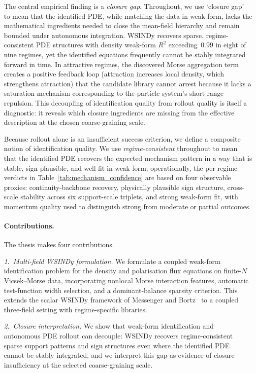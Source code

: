 The central empirical finding is a \emph{closure gap}.  Throughout, we use `closure gap' to mean that the identified PDE, while matching the data in weak form, lacks the mathematical ingredients needed to close the mean-field hierarchy and remain bounded under autonomous integration.  WSINDy recovers sparse, regime-consistent PDE structures with density weak-form $R^2$ exceeding~$0.99$ in eight of nine regimes, yet the identified equations frequently cannot be stably integrated forward in time.  In attractive regimes, the discovered Morse aggregation term creates a positive feedback loop (attraction increases local density, which strengthens attraction) that the candidate library cannot arrest because it lacks a saturation mechanism corresponding to the particle system's short-range repulsion.  This decoupling of identification quality from rollout quality is itself a diagnostic: it reveals which closure ingredients are missing from the effective description at the chosen coarse-graining scale.

Because rollout alone is an insufficient success criterion, we define a composite notion of identification quality.  We use \emph{regime-consistent} throughout to mean that the identified PDE recovers the expected mechanism pattern in a way that is stable, sign-plausible, and well fit in weak form; operationally, the per-regime verdicts in Table~\ref{tab:mechanism_confidence} are based on four observable proxies: continuity-backbone recovery, physically plausible sign structure, cross-scale stability across six support-scale triplets, and strong weak-form fit, with momentum quality used to distinguish strong from moderate or partial outcomes.

\paragraph{Contributions.}
The thesis makes four contributions.

\emph{1.\ Multi-field WSINDy formulation.}
We formulate a coupled weak-form identification problem for the density and polarisation flux equations on finite-$N$ Vicsek--Morse data, incorporating nonlocal Morse interaction features, automatic test-function width selection, and a dominant-balance sparsity criterion.  This extends the scalar WSINDy framework of Messenger and Bortz~\cite{messenger2022meanfield} to a coupled three-field setting with regime-specific libraries.

\emph{2.\ Closure interpretation.}
We show that weak-form identification and autonomous PDE rollout can decouple: WSINDy recovers regime-consistent sparse support patterns and sign structures even where the identified PDE cannot be stably integrated, and we interpret this gap as evidence of closure insufficiency at the selected coarse-graining scale.

